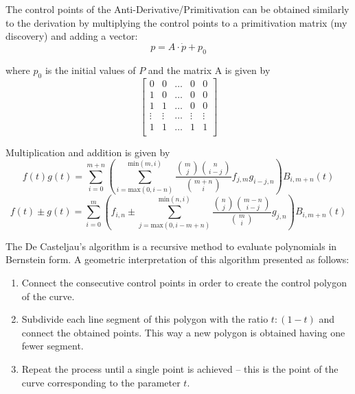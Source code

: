 \par The control points of the Anti-Derivative/Primitivation can be obtained similarly to the derivation by multiplying the control points to a primitivation matrix (my discovery) and adding a vector:
\begin{equation}
    p = A \cdot \dot{p}  + p_0
\end{equation}

where $p_0$ is the initial values of $P$ and the matrix A is given by 
\begin{equation}
    \begin{bmatrix}
        0 & 0 & \ldots & 0 & 0 \\
        1 & 0 & \ldots & 0 & 0 \\
        1 & 1 & \ldots & 0 & 0 \\
        \vdots & \vdots & \ldots & \vdots & \vdots \\
        1 & 1 & \ldots & 1 & 1 \\
    \end{bmatrix}
\end{equation}




\par Multiplication and addition is given by
\begin{equation}
    \label{eq:bern_mul}
    f(t)g(t) = \sum^{m+n}_{i=0}  \left(\sum_{i=\text{max}(0,i-n)}^{\text{min}(m,i)} \frac{\binom{m}{j}\binom{n}{i-j}}{\binom{m+n}{i}} f_{j,m}g_{i-j,n}\right) B_{i,m+n}(t)
\end{equation}
\begin{equation}
    \label{eq:bern_sum}
    f(t)\pm g(t) = 
    \sum^{m}_{i=0}  \left(f_{i,n} \pm \sum_{j=\text{max}(0,i-m+n)}^{\text{min}(n,i)} \frac{\binom{n}{j}\binom{m-n}{i-j}}{\binom{m}{i}} g_{j,n}\right) B_{i,m+n}(t)
\end{equation}

\par The De Casteljau's algorithm is a recursive method to evaluate polynomials in Bernstein form. A geometric interpretation of this algorithm presented as follows: 
\begin{enumerate}
    \item Connect the consecutive control points in order to create the control polygon of the curve.
	\item Subdivide each line segment of this polygon with the ratio $t:(1-t)$ and connect the obtained points. This way a new polygon is obtained having one fewer segment.
    \item Repeat the process until a single point is achieved – this is the point of the curve corresponding to the parameter $t$.
\end{enumerate}
    
